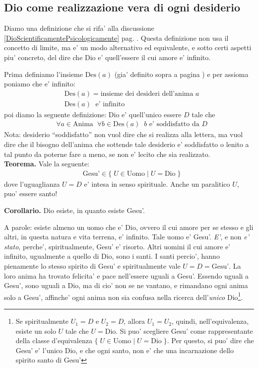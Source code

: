 \pagebreak

\subsection{Dio come realizzazione vera di ogni desiderio}
\label{FormulazionePuntualeDiDio}

Diamo una definizione che si rifa' alla discussione \ref{DioScientificamentePsicologicamente} pag. \pageref{DioScientificamentePsicologicamente}. Questa definizione non usa il concetto di limite, ma e' un modo alternativo ed equivalente, e sotto certi aspetti piu' concreto, del dire che Dio e' quell'essere il cui amore e' infinito.

Prima definiamo l'insieme $\textrm{Des}(a)$ (gia' definito sopra a pagina \pageref{defDiDesideriDes}) e per assioma poniamo che e' infinito:
    \begin{align*}
        &\textrm{Des}(a) = \textrm{insieme dei desideri dell'anima } a\\
        &\textrm{Des}(a)\;\textrm{ e' infinito }
    \end{align*}
    poi diamo la seguente definizione: Dio e' quell'unico essere $D$ tale che
    \begin{align*}
        &\forall a \in \textrm{Anima}\;\;\forall b \in \textrm{Des}(a)\;\;b \textrm{ e' soddisfatto da }D
    \end{align*}
    Nota: desiderio ``soddisfatto'' non vuol dire che si realizza alla lettera, ma vuol dire che il bisogno dell'anima che sottende tale desiderio e' soddisfatto o lenito a tal punto da poterne fare a meno, se non e' lecito che sia realizzato.\\

    \textbf{Teorema.} Vale la seguente:
    \begin{align*}
        &\textrm{Gesu'}\in \{ \;U\in\textrm{Uomo}\;|\;U=\textrm{Dio}\;\}
    \end{align*}
    dove l'uguaglianza $U=D$ e' intesa in senso spirituale. Anche un paralitico $U$, puo' essere santo!

    \textbf{Corollario. } Dio esiste, in quanto esiste Gesu'.

    A parole: esiste almeno un uomo che e' Dio, ovvero il cui amore per se stesso e gli altri, in questa natura e vita terrena, e' infinito. Tale uomo e' Gesu'. \emph{E'}, e non \emph{e' stato}, perche', spiritualmente, Gesu' e' risorto. Altri uomini il cui amore e' infinito, ugualmente a quello di Dio, sono i santi. I santi percio', hanno pienamente lo stesso spirito di Gesu' e spiritualmente vale $U=D=\textrm{Gesu'}$. La loro anima ha trovato felicita' e pace nell'essere uguali a Gesu'. Essendo uguali a Gesu', sono uguali a Dio, ma di cio' non se ne vantano, e rimandano ogni anima solo a Gesu', affinche' ogni anima non sia confusa nella ricerca dell'\emph{unico} Dio\footnote{Se spiritualmente $U_1=D$ e $U_2=D$, allora $U_1=U_2$, quindi, nell'equivalenza, esiste un solo $U$ tale che $U=\textrm{Dio}$. Si puo' scegliere Gesu' come rappresentante della classe d'equivalenza $\{ \;U\in\textrm{Uomo}\;|\;U=\textrm{Dio}\;\}$. Per questo, si puo' dire che Gesu' e' l'unico Dio, e che ogni santo, non e' che una incarnazione dello spirito santo di Gesu'}.


